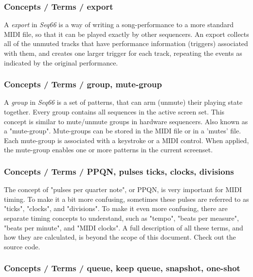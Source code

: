 \subsubsection{Concepts / Terms / export}
\label{subsubsec:concepts_terms_export}

   A \textsl{export} in \textsl{Seq66} is a way of writing a
   song-performance to a more standard MIDI file, so that it can be played
   exactly by other sequencers.
   An export collects all of the unmuted tracks that have
   performance information (triggers) associated with them, and creates one
   larger trigger for each track, repeating the events as indicated by the
   original performance.

\subsubsection{Concepts / Terms / group, mute-group}
\label{subsubsec:concepts_terms_group}

   A \textsl{group} in \textsl{Seq66} is a
   set of patterns, that can arm (unmute) their playing state
   together.
   Every group contains all sequences in the active screen set. 
   This concept is similar to mute/unmute groups in hardware
   sequencers.
   Also known as a "mute-group".
   Mute-groups can be stored in the MIDI file or in a 'mutes' file.
   Each mute-group is associated with a keystroke or a MIDI control.
   When applied, the mute-group enables one or more patterns in the current
   screenset.

\subsubsection{Concepts / Terms / PPQN, pulses ticks, clocks, divisions}
\label{subsubsec:concepts_terms_pulses}

   The concept of "pulses per quarter note", or PPQN, is very important for
   MIDI timing.  To make it a bit more confusing, sometimes these pulses are
   referred to as "ticks", "clocks", and "divisions".
   To make it even more confusing, there are separate timing concepts to
   understand, such as "tempo", "beats per measure", "beats per minute", and
   "MIDI clocks".
   A full description of all these terms, and how they are calculated, is
   beyond the scope of this document.  Check out the source code.

\subsubsection{Concepts / Terms / queue, keep queue, snapshot, one-shot}
\label{subsubsec:concepts_terms_queue_mode}

